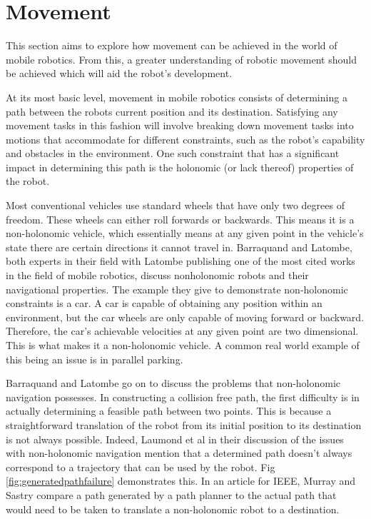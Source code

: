 			\section{Movement}
			\label{litreview:movement}
			This section aims to explore how movement can be achieved in the world of mobile robotics. From this, a greater understanding of robotic movement should be achieved which will aid the robot's development.
			
			At its most basic level, movement in mobile robotics consists of determining a path between the robots current position and its destination. Satisfying any movement tasks in this fashion will involve breaking down movement tasks into motions that accommodate for different constraints, such as the robot's capability and obstacles in the environment. One such constraint that has a significant impact in determining this path is the holonomic (or lack thereof) properties of the robot.
			
			Most conventional vehicles use standard wheels that have only two degrees of freedom. These wheels can either roll forwards or backwards. This means it is a non-holonomic vehicle, which essentially means at any given point in the vehicle's state there are certain directions it cannot travel in. Barraquand and Latombe\citep{barraquand1989nonholonomic}, both experts in their field with Latombe publishing one of the most cited works in the field of mobile robotics, discuss nonholonomic robots and their navigational properties. The example they give to demonstrate non-holonomic constraints is a car. A car is capable of obtaining any position within an environment, but the car wheels are only capable of moving forward or backward. Therefore, the car's achievable velocities at any given point are two dimensional. This is what makes it a non-holonomic vehicle. A common real world example of this being an issue is in parallel parking.
			
			Barraquand and Latombe go on to discuss the problems that non-holonomic navigation possesses. In constructing a collision free path, the first difficulty is in actually determining a feasible path between two points. This is because a straightforward translation of the robot from its initial position to its destination is not always possible. Indeed, Laumond et al\citep{laumond1994motion} in their discussion of the issues with non-holonomic navigation mention that a determined path doesn't always correspond to a trajectory that can be used by the robot. Fig \ref{fig:generatedpathfailure} demonstrates this. In an article for IEEE, Murray and Sastry\citep{murray1993nonholonomic} compare a path generated by a path planner to the actual path that would need to be taken to translate a non-holonomic robot to a destination.
			
